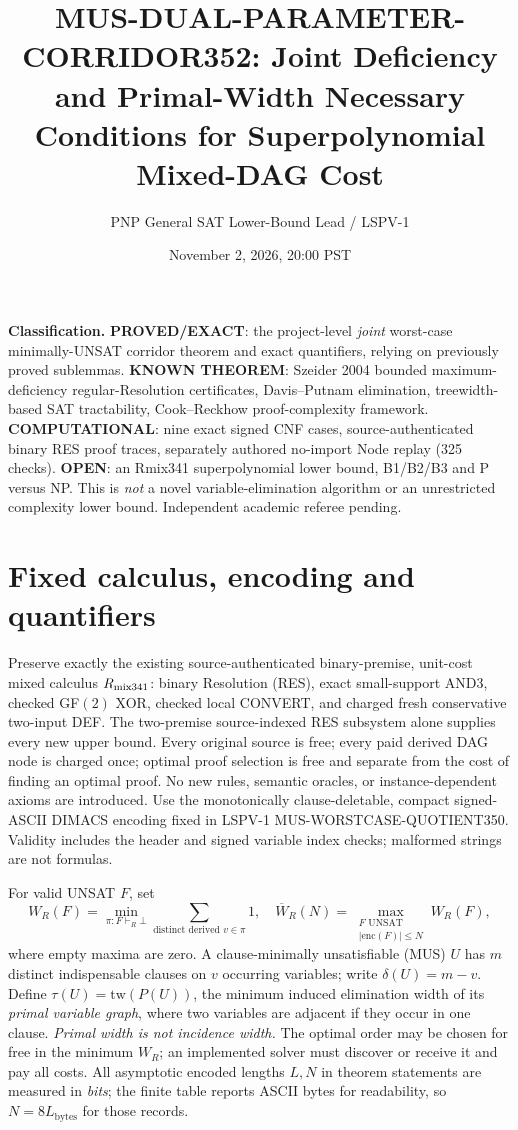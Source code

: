 \documentclass[11pt]{article}
\title{MUS-DUAL-PARAMETER-CORRIDOR352: Joint Deficiency and Primal-Width Necessary Conditions for Superpolynomial Mixed-DAG Cost}
\author{PNP General SAT Lower-Bound Lead / LSPV-1}
\date{November 2, 2026, 20:00 PST}
\begin{document}
\maketitle

\noindent\textbf{Classification.} \textbf{PROVED/EXACT}: the project-level \emph{joint} worst-case minimally-UNSAT corridor theorem and exact quantifiers, relying on previously proved sublemmas. \textbf{KNOWN THEOREM}: Szeider 2004 bounded maximum-deficiency regular-Resolution certificates, Davis--Putnam elimination, treewidth-based SAT tractability, Cook--Reckhow proof-complexity framework. \textbf{COMPUTATIONAL}: nine exact signed CNF cases, source-authenticated binary RES proof traces, separately authored no-import Node replay (325 checks). \textbf{OPEN}: an Rmix341 superpolynomial lower bound, B1/B2/B3 and P versus NP. This is \emph{not} a novel variable-elimination algorithm or an unrestricted complexity lower bound. Independent academic referee pending.

\section*{Fixed calculus, encoding and quantifiers}
Preserve exactly the existing source-authenticated binary-premise, unit-cost mixed calculus $R_{\rm mix341}$: binary Resolution (RES), exact small-support AND3, checked GF$(2)$ XOR, checked local CONVERT, and charged fresh conservative two-input DEF. The two-premise source-indexed RES subsystem alone supplies every new upper bound. Every original source is free; every paid derived DAG node is charged once; optimal proof selection is free and separate from the cost of finding an optimal proof. No new rules, semantic oracles, or instance-dependent axioms are introduced. Use the monotonically clause-deletable, compact signed-ASCII DIMACS encoding fixed in LSPV-1 MUS-WORSTCASE-QUOTIENT350. Validity includes the header and signed variable index checks; malformed strings are not formulas.

For valid UNSAT $F$, set
\[
W_R(F)=\min_{\pi:F\vdash_R\bot}\sum_{\text{distinct derived }v\in\pi}1,\quad
\overline W_R(N)=\max_{\substack{F\text{ UNSAT}\\|\mathrm{enc}(F)|\le N}}W_R(F),
\]
where empty maxima are zero. A clause-minimally unsatisfiable (MUS) $U$ has $m$ distinct indispensable clauses on $v$ occurring variables; write $\delta(U)=m-v$. Define $\tau(U)=\mathrm{tw}(P(U))$, the minimum induced elimination width of its \emph{primal variable graph}, where two variables are adjacent if they occur in one clause. \emph{Primal width is not incidence width.} The optimal order may be chosen for free in the minimum $W_R$; an implemented solver must discover or receive it and pay all costs. All asymptotic encoded lengths $L,N$ in theorem statements are measured in \emph{bits}; the finite table reports ASCII bytes for readability, so $N=8L_{\mathrm{bytes}}$ for those records.
\end{document}
